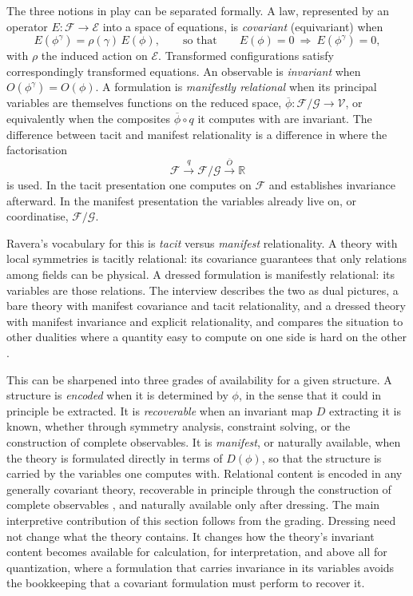 \documentclass[11pt]{article}
\theoremstyle{plain}
\theoremstyle{definition}
\theoremstyle{remark}
\newcommand{\F}{\mathcal F}
\newcommand{\G}{\mathcal G}
\begin{document}
The three notions in play can be separated formally. A law, represented by an operator $E:\F\to\mathcal E$ into a space of equations, is \emph{covariant} (equivariant) when
\begin{equation}
E(\phi^\gamma)=\rho(\gamma)\,E(\phi),\qquad\text{so that}\qquad E(\phi)=0\ \Rightarrow\ E(\phi^\gamma)=0,
\end{equation}
with $\rho$ the induced action on $\mathcal E$. Transformed configurations satisfy correspondingly transformed equations. An observable is \emph{invariant} when $O(\phi^\gamma)=O(\phi)$. A formulation is \emph{manifestly relational} when its principal variables are themselves functions on the reduced space, $\overline\phi:\F/\G\to\mathcal V$, or equivalently when the composites $\overline\phi\circ q$ it computes with are invariant. The difference between tacit and manifest relationality is a difference in where the factorisation
\begin{equation}
\F\xrightarrow{\;q\;}\F/\G\xrightarrow{\;\overline O\;}\mathbb R
\end{equation}
is used. In the tacit presentation one computes on $\F$ and establishes invariance afterward. In the manifest presentation the variables already live on, or coordinatise, $\F/\G$.

Ravera's vocabulary for this is \emph{tacit} versus \emph{manifest} relationality. A theory with local symmetries is tacitly relational: its covariance guarantees that only relations among fields can be physical. A dressed formulation is manifestly relational: its variables are those relations. The interview describes the two as dual pictures, a bare theory with manifest covariance and tacit relationality, and a dressed theory with manifest invariance and explicit relationality, and compares the situation to other dualities where a quantity easy to compute on one side is hard on the other \cite{toe}.

This can be sharpened into three grades of availability for a given structure. A structure is \emph{encoded} when it is determined by $\phi$, in the sense that it could in principle be extracted. It is \emph{recoverable} when an invariant map $D$ extracting it is known, whether through symmetry analysis, constraint solving, or the construction of complete observables. It is \emph{manifest}, or naturally available, when the theory is formulated directly in terms of $D(\phi)$, so that the structure is carried by the variables one computes with.
Relational content is encoded in any generally covariant theory, recoverable in principle through the construction of complete observables \cite{rovelli-partial,dittrich}, and naturally available only after dressing. The main interpretive contribution of this section follows from the grading. Dressing need not change what the theory contains. It changes how the theory's invariant content becomes available for calculation, for interpretation, and above all for quantization, where a formulation that carries invariance in its variables avoids the bookkeeping that a covariant formulation must perform to recover it.
\end{document}
